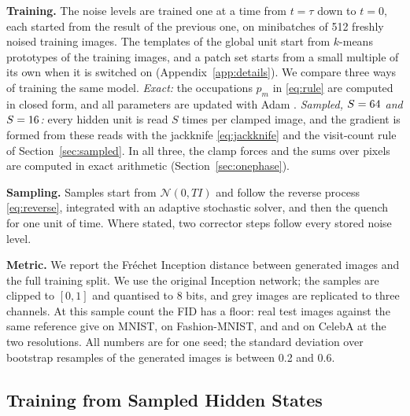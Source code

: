 \documentclass{article}
\newif\ifshownotes
\newcommand{\todo}[1]{\ifshownotes\textcolor{tbdcolor}{[TODO: #1]}\fi}
\begin{document}
\textbf{Training.}
The noise levels are trained one at a time from $t=\tau$ down to $t=0$, each
started from the result of the previous one, on minibatches of 512 freshly
noised training images. The templates of the global unit start from $k$-means
prototypes of the training images, and a patch set starts from a small
multiple of its own when it is switched on (Appendix~\ref{app:details}). We
compare three ways of training the same model.
\emph{Exact:} the occupations $p_m$ in \eqref{eq:rule} are computed in closed
form, and all parameters are updated with Adam \citep{kingma2015adam}.
\emph{Sampled, $S=64$ and $S=16$:} every hidden unit is read $S$
times per clamped image, and the gradient is formed from these reads with the
jackknife \eqref{eq:jackknife} and the visit-count rule of
Section~\ref{sec:sampled}.
In all three, the clamp forces and the sums over pixels are computed in exact
arithmetic (Section~\ref{sec:onephase}).

\textbf{Sampling.}
Samples start from $\mathcal{N}(0,TI)$ and follow the reverse process
\eqref{eq:reverse}, integrated with an adaptive stochastic solver, and then
the quench for one unit of time. Where stated, two corrector steps follow
every stored noise level.

\textbf{Metric.}
We report the Fr\'echet Inception distance \citep{heusel2017gans} between
\nSamples{} generated images and the full training split. We use the original
Inception network; the samples are clipped to $[0,1]$ and quantised to 8 bits,
and grey images are replicated to three channels. At this sample count the FID
has a floor: \nSamples{} real test images against the same reference give
\floorMnist{} on MNIST, \floorFashion{} on Fashion-MNIST, and \floorCelebLow{}
and \floorCelebHigh{} on CelebA at the two resolutions. All numbers are for
one seed; the standard deviation over bootstrap resamples of the generated
images is between 0.2 and 0.6.
\todo{second wave: three seeds, also for the exact runs; decide between
2{,}000 and 10{,}000 samples.}

\subsection{Training from Sampled Hidden States}
\end{document}
